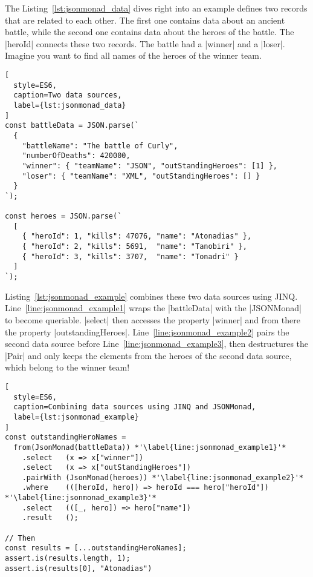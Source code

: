 The Listing~\ref{lst:jsonmonad_data} dives right into an example defines two
records that are related to each other. The first one contains data about an
ancient battle, while the second one contains data about the heroes of the
battle. The |heroId| connects these two records. The battle had a |winner| and
a |loser|. Imagine you want to find all names of the heroes of the winner team.

\begin{lstlisting}[
  style=ES6,
  caption=Two data sources,
  label={lst:jsonmonad_data}
]
const battleData = JSON.parse(`
  {
    "battleName": "The battle of Curly",
    "numberOfDeaths": 420000,
    "winner": { "teamName": "JSON", "outStandingHeroes": [1] },
    "loser": { "teamName": "XML", "outStandingHeroes": [] }
  }
`);

const heroes = JSON.parse(`
  [
    { "heroId": 1, "kills": 47076, "name": "Atonadias" },
    { "heroId": 2, "kills": 5691,  "name": "Tanobiri" },
    { "heroId": 3, "kills": 3707,  "name": "Tonadri" }
  ]
`);
\end{lstlisting}

Listing~\ref{lst:jsonmonad_example} combines these two data sources using JINQ.
Line~\ref{line:jsonmonad_example1} wraps the |battleData| with the |JSONMonad|
to become queriable. |select| then accesses the property |winner| and from
there the property |outstandingHeroes|. Line~\ref{line:jsonmonad_example2}
pairs the second data source before Line~\ref{line:jsonmonad_example3}, then
destructures the |Pair| and only keeps the elements from the heroes of the
second data source, which belong to the winner team!

\begin{lstlisting}[
  style=ES6,
  caption=Combining data sources using JINQ and JSONMonad,
  label={lst:jsonmonad_example}
]
const outstandingHeroNames =
  from(JsonMonad(battleData)) *'\label{line:jsonmonad_example1}'*
    .select   (x => x["winner"])
    .select   (x => x["outStandingHeroes"])
    .pairWith (JsonMonad(heroes)) *'\label{line:jsonmonad_example2}'*
    .where    (([heroId, hero]) => heroId === hero["heroId"]) *'\label{line:jsonmonad_example3}'*
    .select   (([_, hero]) => hero["name"])
    .result   ();

// Then
const results = [...outstandingHeroNames];
assert.is(results.length, 1);
assert.is(results[0], "Atonadias")
\end{lstlisting}

